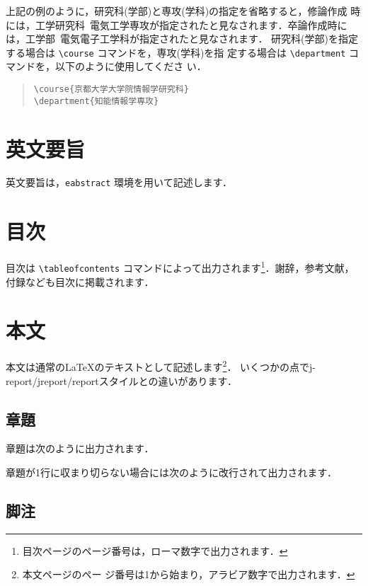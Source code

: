 \documentclass[sotsuron]{kuee}
\begin{document}
上記の例のように，研究科(学部)と専攻(学科)の指定を省略すると，修論作成
時には，工学研究科~電気工学専攻が指定されたと見なされます．卒論作成時に
は，工学部~電気電子工学科が指定されたと見なされます．
%
研究科(学部)を指定する場合は \verb+\course+ コマンドを，専攻(学科)を指
定する場合は \verb+\department+ コマンドを，以下のように使用してくださ
い．
\begin{quote}
  \begin{verbatim}
\course{京都大学大学院情報学研究科}
\department{知能情報学専攻}
\end{verbatim}
\end{quote}


\section{英文要旨}
英文要旨は，\verb+eabstract+ 環境を用いて記述します．


\section{目次}
目次は \verb+\tableofcontents+ コマンドによって出力されます\footnote
{目次ページのページ番号は，ローマ数字で出力されます．}．謝辞，参考文献，
付録なども目次に掲載されます．


\section{本文}
本文は通常の\LaTeX のテキストとして記述します\footnote{本文ページのペー
  ジ番号は1から始まり，アラビア数字で出力されます．}．
いくつかの点でj-report/jreport/reportスタイルとの違いがあります．

\subsection{章題}
章題は次のように出力されます．


章題が1行に収まり切らない場合には次のように改行されて出力されます．


\subsection{脚注}
\end{document}
